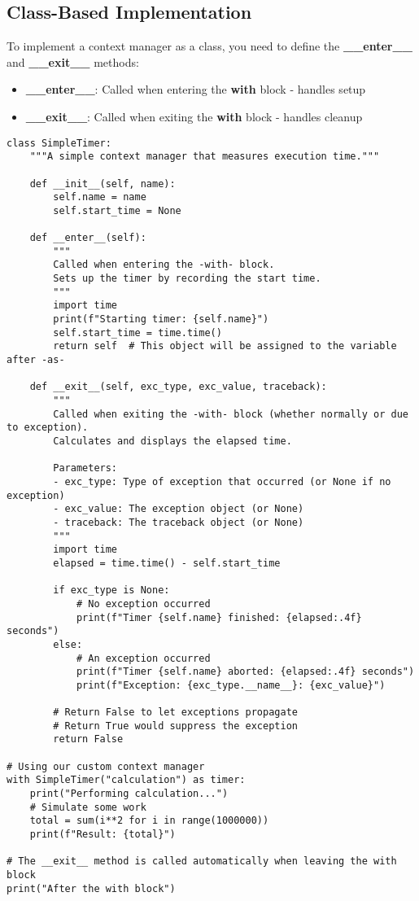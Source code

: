 \documentclass[12pt,letterpaper]{article}
\newenvironment{macterminal}{%
    \begin{mdframed}[
        linecolor=terminalFrame,
        backgroundcolor=terminalBg,
        roundcorner=5pt,
        skipabove=10pt,
        skipbelow=10pt,
        linewidth=1pt,
        innertopmargin=10pt, %
        frametitle={%
            \tikz[baseline=(current bounding box.east), outer sep=0pt]{
                \fill[red!80!black] (0,0) circle (5pt);
                \fill[yellow!80!black] (0.7,0) circle (5pt);
                \fill[green!70!black] (1.4,0) circle (5pt);
            }
        },
        frametitlealignment=\raggedright, %
        frametitleaboveskip=8pt, %
        frametitlebelowskip=0pt, %
    ]
}{%
    \end{mdframed}%
}
\begin{document}
\subsection{Class-Based Implementation}

To implement a context manager as a class, you need to define the \textbf{\textcolor{accentColor}{\_\_enter\_\_}} and \textbf{\textcolor{accentColor}{\_\_exit\_\_}} methods:

\begin{itemize}
    \item \textbf{\textcolor{pythonBlue}{\_\_enter\_\_}}: Called when entering the \textbf{with} block - handles setup
    \item \textbf{\textcolor{pythonBlue}{\_\_exit\_\_}}: Called when exiting the \textbf{with} block - handles cleanup
\end{itemize}

\begin{macterminal}
\begin{lstlisting}
class SimpleTimer:
    """A simple context manager that measures execution time."""
    
    def __init__(self, name):
        self.name = name
        self.start_time = None
        
    def __enter__(self):
        """
        Called when entering the -with- block.
        Sets up the timer by recording the start time.
        """
        import time
        print(f"Starting timer: {self.name}")
        self.start_time = time.time()
        return self  # This object will be assigned to the variable after -as-
        
    def __exit__(self, exc_type, exc_value, traceback):
        """
        Called when exiting the -with- block (whether normally or due to exception).
        Calculates and displays the elapsed time.
        
        Parameters:
        - exc_type: Type of exception that occurred (or None if no exception)
        - exc_value: The exception object (or None)
        - traceback: The traceback object (or None)
        """
        import time
        elapsed = time.time() - self.start_time
        
        if exc_type is None:
            # No exception occurred
            print(f"Timer {self.name} finished: {elapsed:.4f} seconds")
        else:
            # An exception occurred
            print(f"Timer {self.name} aborted: {elapsed:.4f} seconds")
            print(f"Exception: {exc_type.__name__}: {exc_value}")
            
        # Return False to let exceptions propagate
        # Return True would suppress the exception
        return False

# Using our custom context manager
with SimpleTimer("calculation") as timer:
    print("Performing calculation...")
    # Simulate some work
    total = sum(i**2 for i in range(1000000))
    print(f"Result: {total}")

# The __exit__ method is called automatically when leaving the with block
print("After the with block")
\end{lstlisting}
\end{macterminal}
\end{document}
